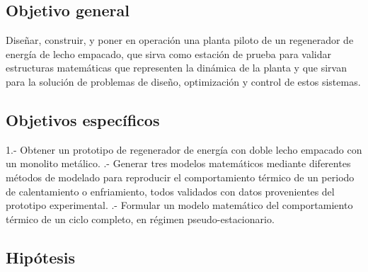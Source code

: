 \subsection{Objetivo general}
Diseñar, construir, y poner en operaci\'on una planta piloto de un regenerador de energ\'ia de lecho empacado, que sirva como estaci\'on de prueba para validar estructuras matem\'aticas que representen la din\'amica de la
planta y que sirvan para la soluci\'on de problemas de diseño, optimizaci\'on y control de estos sistemas.
\subsection{Objetivos espec\'ificos}
1.- Obtener un prototipo de regenerador de energ\'ia con doble lecho empacado con un monolito met\'alico.
.- Generar tres modelos matem\'aticos mediante diferentes m\'etodos de modelado para reproducir el
comportamiento t\'ermico de un periodo de calentamiento o enfriamiento, todos validados con datos
provenientes del prototipo experimental.
.- Formular un modelo matem\'atico del comportamiento t\'ermico de un ciclo completo, en r\'egimen pseudo-estacionario.
\subsection{Hip\'otesis}


